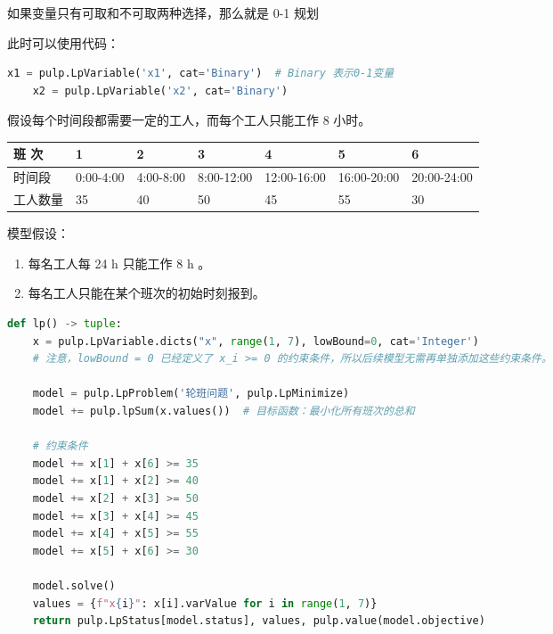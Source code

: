 \begin{definition}
    如果变量只有可取和不可取两种选择，那么就是 0-1 规划
\end{definition}

此时可以使用代码：

\begin{lstlisting}[language=python, caption=0-1 规划的 Python 代码]
    x1 = pulp.LpVariable('x1', cat='Binary')  # Binary 表示0-1变量
    x2 = pulp.LpVariable('x2', cat='Binary')
\end{lstlisting}

\begin{example}[轮班问题]

    假设每个时间段都需要一定的工人，而每个工人只能工作 8 小时。

    \begin{center}
        \begin{tabular}{|l|l|l|l|l|l|l|}
            \hline 班 次  & 1         & 2         & 3          & 4           & 5           & 6           \\
            \hline 时间段  & 0:00-4:00 & 4:00-8:00 & 8:00-12:00 & 12:00-16:00 & 16:00-20:00 & 20:00-24:00 \\
            \hline 工人数量 & 35        & 40        & 50         & 45          & 55          & 30          \\
            \hline
        \end{tabular}
    \end{center}

    模型假设：
    \begin{enumerate}
        \item 每名工人每 24 h 只能工作 8 h 。
        \item 每名工人只能在某个班次的初始时刻报到。
    \end{enumerate}
\end{example}

\begin{lstlisting}[language=python, caption={0-1 规划的 Python 代码}]
def lp() -> tuple:
    x = pulp.LpVariable.dicts("x", range(1, 7), lowBound=0, cat='Integer')
    # 注意，lowBound = 0 已经定义了 x_i >= 0 的约束条件，所以后续模型无需再单独添加这些约束条件。

    model = pulp.LpProblem('轮班问题', pulp.LpMinimize)
    model += pulp.lpSum(x.values())  # 目标函数：最小化所有班次的总和

    # 约束条件
    model += x[1] + x[6] >= 35
    model += x[1] + x[2] >= 40
    model += x[2] + x[3] >= 50
    model += x[3] + x[4] >= 45
    model += x[4] + x[5] >= 55
    model += x[5] + x[6] >= 30

    model.solve()
    values = {f"x{i}": x[i].varValue for i in range(1, 7)}
    return pulp.LpStatus[model.status], values, pulp.value(model.objective)
\end{lstlisting}

